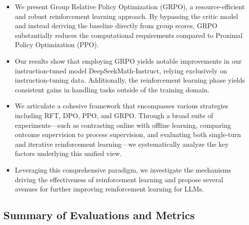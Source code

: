 \begin{itemize}[topsep=0pt]
    \item We present Group Relative Policy Optimization (GRPO), a resource-efficient and robust reinforcement learning approach. By bypassing the critic model and instead deriving the baseline directly from group scores, GRPO substantially reduces the computational requirements compared to Proximal Policy Optimization (PPO).
    \item Our results show that employing GRPO yields notable improvements in our instruction-tuned model DeepSeekMath-Instruct, relying exclusively on instruction-tuning data. Additionally, the reinforcement learning phase yields consistent gains in handling tasks outside of the training domain.
    \item We articulate a cohesive framework that encompasses various strategies including RFT, DPO, PPO, and GRPO. Through a broad suite of experiments—such as contrasting online with offline learning, comparing outcome supervision to process supervision, and evaluating both single-turn and iterative reinforcement learning—we systematically analyze the key factors underlying this unified view.
    \item Leveraging this comprehensive paradigm, we investigate the mechanisms driving the effectiveness of reinforcement learning and propose several avenues for further improving reinforcement learning for LLMs.
\end{itemize}

\subsection{Summary of Evaluations and Metrics}

